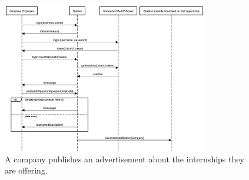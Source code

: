     \begin{figure}[H]
        \centering
        \includegraphics[width=0.8\textwidth]{RASD/Assets/SequenceDiagrams/4-company-publish-and-adv.png}
        \caption{A company publishes an advertisement about the internships they
are offering.}
        \label{fig:A company publishes an advertisement about the internships they
are offering}
    \end{figure}


